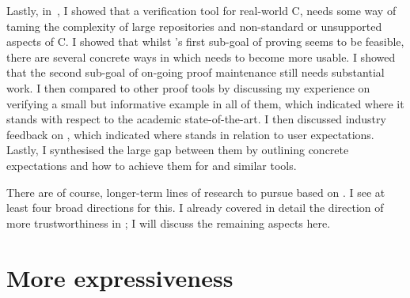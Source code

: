 Lastly, in~, I showed that a verification tool for
real-world C, needs some way of taming the complexity of large repositories and
non-standard or unsupported aspects of C. I showed that whilst 's first
sub-goal of proving  seems to be feasible, there are several concrete
ways in which needs to become more usable. I showed that the second sub-goal of
on-going proof maintenance still needs substantial work. I then compared
 to other proof tools by discussing my experience on verifying a small
but informative example in all of them, which indicated where it stands with
respect to the academic state-of-the-art. I then discussed industry feedback on
, which indicated where  stands in relation to user
expectations. Lastly, I synthesised the large gap between them by outlining
concrete expectations and how to achieve them for  and similar tools.

There are of course, longer-term lines of research to pursue based on .
I see at least four broad directions for this. I already covered in detail the
direction of more trustworthiness in ; I will
discuss the remaining aspects here.

\section{More expressiveness}

